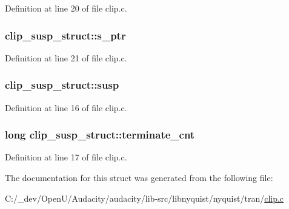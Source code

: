 Definition at line 20 of file clip.\+c.

\subsubsection[{\texorpdfstring{s\+\_\+ptr}{s_ptr}}]{ clip\+\_\+susp\+\_\+struct\+::s\+\_\+ptr}\hypertarget{structclip__susp__struct_af31a6c0f02edefcb7f83f70382f36468}{}\label{structclip__susp__struct_af31a6c0f02edefcb7f83f70382f36468}


Definition at line 21 of file clip.\+c.

\subsubsection[{\texorpdfstring{susp}{susp}}]{ clip\+\_\+susp\+\_\+struct\+::susp}\hypertarget{structclip__susp__struct_ac61438cb89b1baa39a55dc5a073a8d5a}{}\label{structclip__susp__struct_ac61438cb89b1baa39a55dc5a073a8d5a}


Definition at line 16 of file clip.\+c.

\subsubsection[{\texorpdfstring{terminate\+\_\+cnt}{terminate_cnt}}]{\setlength{\rightskip}{0pt plus 5cm}long clip\+\_\+susp\+\_\+struct\+::terminate\+\_\+cnt}\hypertarget{structclip__susp__struct_a0019def1ed0bf8d21ea246fbe70c1c20}{}\label{structclip__susp__struct_a0019def1ed0bf8d21ea246fbe70c1c20}


Definition at line 17 of file clip.\+c.



The documentation for this struct was generated from the following file\+:\begin{DoxyCompactItemize}
\item 
C\+:/\+\_\+dev/\+Open\+U/\+Audacity/audacity/lib-\/src/libnyquist/nyquist/tran/\hyperlink{clip_8c}{clip.\+c}\end{DoxyCompactItemize}
